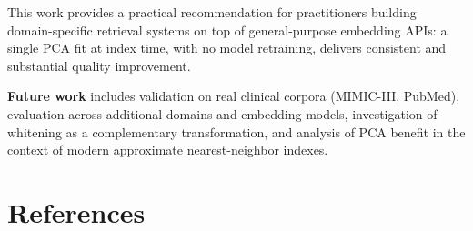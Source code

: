 \documentclass[
  11pt,
  letterpaper,
]{article}
\begin{document}
This work provides a practical recommendation for practitioners building
domain-specific retrieval systems on top of general-purpose embedding
APIs: a single PCA fit at index time, with no model retraining, delivers
consistent and substantial quality improvement.

\textbf{Future work} includes validation on real clinical corpora
(MIMIC-III, PubMed), evaluation across additional domains and embedding
models, investigation of whitening as a complementary transformation,
and analysis of PCA benefit in the context of modern approximate
nearest-neighbor indexes.

\section{References}\label{references}
\end{document}
